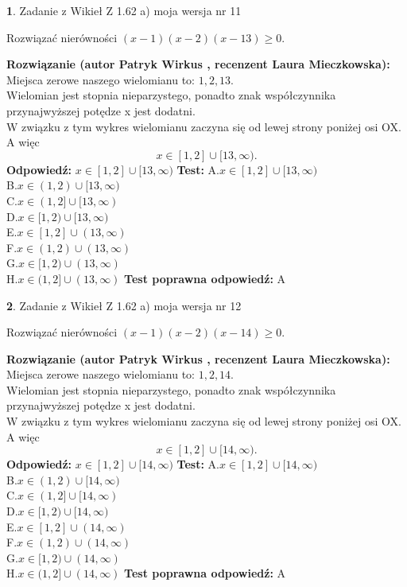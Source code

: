 \documentclass[12pt, a4paper]{article}
\theoremstyle{definition} %
\newtheorem{zad}{}
\newcommand{\zadStart}[1]{\begin{zad}#1\newline}
\newcommand{\zadStop}{\end{zad}}
\newcommand{\rozwStart}[2]{\noindent \textbf{Rozwiązanie (autor #1 , recenzent #2): }\newline}
\newcommand{\rozwStop}{\newline}
\newcommand{\odpStart}{\noindent \textbf{Odpowiedź:}\newline}
\newcommand{\odpStop}{\newline}
\newcommand{\testStart}{\noindent \textbf{Test:}\newline}
\newcommand{\testStop}{\newline}
\newcommand{\kluczStart}{\noindent \textbf{Test poprawna odpowiedź:}\newline}
\newcommand{\kluczStop}{\newline}
\begin{document}
\zadStart{Zadanie z Wikieł Z 1.62 a) moja wersja nr 11}

Rozwiązać nierówności $(x-1)(x-2)(x-13)\ge0$.
\zadStop
\rozwStart{Patryk Wirkus}{Laura Mieczkowska}
Miejsca zerowe naszego wielomianu to: $1, 2, 13$.\\
Wielomian jest stopnia nieparzystego, ponadto znak współczynnika przy\linebreak najwyższej potędze x jest dodatni.\\ W związku z tym wykres wielomianu zaczyna się od lewej strony poniżej osi OX. A więc $$x \in [1,2] \cup [13,\infty).$$
\rozwStop
\odpStart
$x \in [1,2] \cup [13,\infty)$
\odpStop
\testStart
A.$x \in [1,2] \cup [13,\infty)$\\
B.$x \in (1,2) \cup [13,\infty)$\\
C.$x \in (1,2] \cup [13,\infty)$\\
D.$x \in [1,2) \cup [13,\infty)$\\
E.$x \in [1,2] \cup (13,\infty)$\\
F.$x \in (1,2) \cup (13,\infty)$\\
G.$x \in [1,2) \cup (13,\infty)$\\
H.$x \in (1,2] \cup (13,\infty)$
\testStop
\kluczStart
A
\kluczStop



\zadStart{Zadanie z Wikieł Z 1.62 a) moja wersja nr 12}

Rozwiązać nierówności $(x-1)(x-2)(x-14)\ge0$.
\zadStop
\rozwStart{Patryk Wirkus}{Laura Mieczkowska}
Miejsca zerowe naszego wielomianu to: $1, 2, 14$.\\
Wielomian jest stopnia nieparzystego, ponadto znak współczynnika przy\linebreak najwyższej potędze x jest dodatni.\\ W związku z tym wykres wielomianu zaczyna się od lewej strony poniżej osi OX. A więc $$x \in [1,2] \cup [14,\infty).$$
\rozwStop
\odpStart
$x \in [1,2] \cup [14,\infty)$
\odpStop
\testStart
A.$x \in [1,2] \cup [14,\infty)$\\
B.$x \in (1,2) \cup [14,\infty)$\\
C.$x \in (1,2] \cup [14,\infty)$\\
D.$x \in [1,2) \cup [14,\infty)$\\
E.$x \in [1,2] \cup (14,\infty)$\\
F.$x \in (1,2) \cup (14,\infty)$\\
G.$x \in [1,2) \cup (14,\infty)$\\
H.$x \in (1,2] \cup (14,\infty)$
\testStop
\kluczStart
A
\kluczStop
\end{document}
